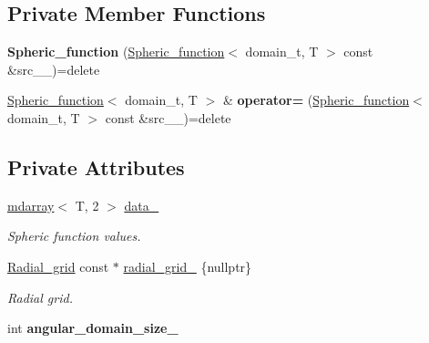 \subsection*{Private Member Functions}
\begin{DoxyCompactItemize}
\item 
\hypertarget{classsirius_1_1_spheric__function_a4201e1c3ed3e095cabf65e66fe4be38f}{}{\bfseries Spheric\+\_\+function} (\hyperlink{classsirius_1_1_spheric__function}{Spheric\+\_\+function}$<$ domain\+\_\+t, T $>$ const \&src\+\_\+\+\_\+)=delete\label{classsirius_1_1_spheric__function_a4201e1c3ed3e095cabf65e66fe4be38f}

\item 
\hypertarget{classsirius_1_1_spheric__function_aa4b6877aa5225f6092b937a20ce36db9}{}\hyperlink{classsirius_1_1_spheric__function}{Spheric\+\_\+function}$<$ domain\+\_\+t, T $>$ \& {\bfseries operator=} (\hyperlink{classsirius_1_1_spheric__function}{Spheric\+\_\+function}$<$ domain\+\_\+t, T $>$ const \&src\+\_\+\+\_\+)=delete\label{classsirius_1_1_spheric__function_aa4b6877aa5225f6092b937a20ce36db9}

\end{DoxyCompactItemize}
\subsection*{Private Attributes}
\begin{DoxyCompactItemize}
\item 
\hyperlink{classsddk_1_1mdarray}{mdarray}$<$ T, 2 $>$ \hyperlink{classsirius_1_1_spheric__function_a0e8e0f85079304c198fa34be514625b5}{data\+\_\+}
\begin{DoxyCompactList}\small\item\em Spheric function values. \end{DoxyCompactList}\item 
\hyperlink{classsirius_1_1_radial__grid}{Radial\+\_\+grid} const $\ast$ \hyperlink{classsirius_1_1_spheric__function_aee29fbd6f02106327ae55a7937556122}{radial\+\_\+grid\+\_\+} \{nullptr\}
\begin{DoxyCompactList}\small\item\em Radial grid. \end{DoxyCompactList}\item 
\hypertarget{classsirius_1_1_spheric__function_a08831be0e219b03870dddc18d0d7ba5e}{}int {\bfseries angular\+\_\+domain\+\_\+size\+\_\+}\label{classsirius_1_1_spheric__function_a08831be0e219b03870dddc18d0d7ba5e}

\end{DoxyCompactItemize}


